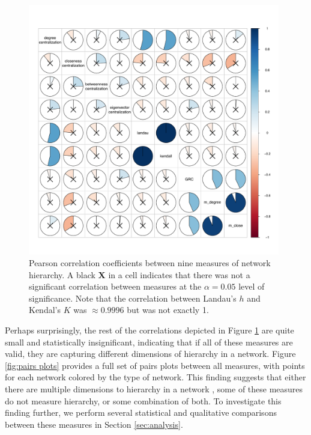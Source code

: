 \documentclass[3p,times]{elsarticle}
\begin{document}
\begin{figure}
\begin{center}
	\caption{\label{fig:measure correlations} Pearson correlation coefficients between nine measures of network hierarchy. A black \textbf{X} in a cell indicates that there was not a significant correlation between measures at the $\alpha = 0.05$ level of significance. Note that the correlation between Landau's $h$ and Kendal's $K$ was $\approx 0.9996$ but was not exactly 1.}
		\includegraphics[width = 0.98\textwidth]{./images/Global_Measure_Correlations_with_Tests.pdf}
\end{center}
\end{figure}

Perhaps surprisingly, the rest of the correlations depicted in Figure \ref{fig:measure correlations} are quite small and statistically insignificant, indicating that if all of these measures are valid, they are capturing different dimensions of hierarchy in a network. Figure \ref{fig:pairs plots} provides a full set of pairs plots between all measures, with points for each network colored by the type of network. This finding suggests that either there are multiple dimensions to hierarchy in a network \cite{Corominas-Murtra2013}, some of these measures do not measure hierarchy, or some combination of both. To investigate this finding further, we perform several statistical and qualitative comparisons between these measures in Section \ref{sec:analysis}.
\end{document}
